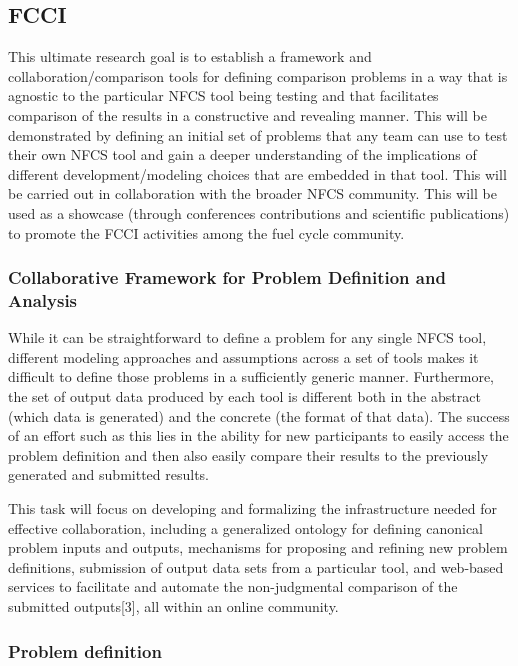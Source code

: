 
\subsection{FCCI}

This ultimate research goal is to establish a framework and
collaboration/comparison tools for defining comparison problems in a way that is
agnostic to the particular NFCS tool being testing and that facilitates
comparison of the results in a constructive and revealing manner.  This will be
demonstrated by defining an initial set of problems that any team can use to
test their own NFCS tool and gain a deeper understanding of the implications of
different development/modeling choices that are embedded in that tool. This will
be carried out in collaboration with the broader NFCS community. This will be
used as a showcase (through conferences contributions and scientific
publications) to promote the FCCI activities among the fuel cycle community. 


\subsubsection{Collaborative Framework for Problem Definition and Analysis} 

While it can be straightforward to define a problem for any single NFCS tool,
different modeling approaches and assumptions across a set of tools makes it
difficult to define those problems in a sufficiently generic manner.
Furthermore, the set of output data produced by each tool is different both in
the abstract (which data is generated) and the concrete (the format of that
data).  The success of an effort such as this lies in the ability for new
participants to easily access the problem definition and then also easily
compare their results to the previously generated and submitted results.

This task will focus on developing and formalizing the infrastructure needed for
effective collaboration, including a generalized ontology for defining canonical
problem inputs and outputs, mechanisms for proposing and refining new problem
definitions, submission of output data sets from a particular tool, and
web-based services to facilitate and automate the non-judgmental comparison of
the submitted outputs[3], all within an online community.  


\subsubsection{Problem definition} 

